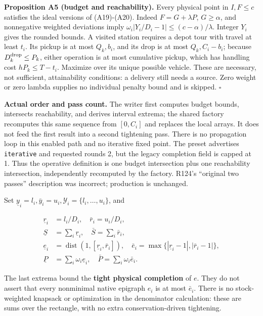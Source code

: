 \documentclass[
  american,
  11pt,
]{article}
\begin{document}

\textbf{Proposition A5 (budget and reachability).} Every physical point
in \(I,F\le c\) satisfies the ideal versions of (A19)-(A20). Indeed
\(F=G+\lambda P\), \(G\ge\alpha\), and nonnegative weighted deviations
imply \(\omega_i|Y_i/D_i-1|\le(c-\alpha)/\lambda\). Integer \(Y_i\)
gives the rounded bounds. A visited station requires a depot tour with
travel at least \(t_i\). Its pickup is at most \(Q_k,b_i\), and its drop
is at most \(Q_k,C_i-b_i\); because \(D_k^{\rm drop}\le P_k\), either
operation is at most cumulative pickup, which has handling cost
\(hP_k\le T-t_i\). Maximize over its unique possible vehicle. These are
necessary, not sufficient, attainability conditions: a delivery still
needs a source. Zero weight or zero lambda supplies no individual
penalty bound and is skipped. \(\square\)

\textbf{Actual order and pass count.} The writer first computes budget
bounds, intersects reachability, and derives interval extrema; the
shared factory recomputes this same sequence from \([0,C_i]\) and
replaces the local arrays. It does not feed the first result into a
second tightening pass. There is no propagation loop in this enabled
path and no iterative fixed point. The preset advertises
\texttt{iterative} and requested rounds 2, but the
legacy completion field is capped at 1. Thus the operative definition is
one budget intersection plus one reachability intersection,
independently recomputed by the factory. R124's ``original two passes''
description was incorrect; production is unchanged.

Set \(\underline y_i=l_i,\bar y_i=u_i,\mathcal Y_i=\{l_i,\ldots,u_i\}\),
and

\[
\begin{aligned}
\underline r_i&=l_i/D_i,\quad\bar r_i=u_i/D_i,\\
\underline S&=\sum_i\underline r_i,\quad\bar S=\sum_i\bar r_i,\\
\underline e_i&=\operatorname{dist}(1,[\underline r_i,\bar r_i]),\quad
\bar e_i=\max\{|\underline r_i-1|,|\bar r_i-1|\},\\
\underline P&=\sum_i\omega_i\underline e_i,\quad\bar P=\sum_i\omega_i\bar e_i.
\end{aligned}
\tag{A21}
\]

The last extrema bound the \textbf{tight physical completion} of \(e\).
They do not assert that every nonminimal native epigraph \(e_i\) is at
most \(\bar e_i\). There is no stock-weighted knapsack or optimization
in the denominator calculation: these are sums over the rectangle, with
no extra conservation-driven tightening.
\end{document}
